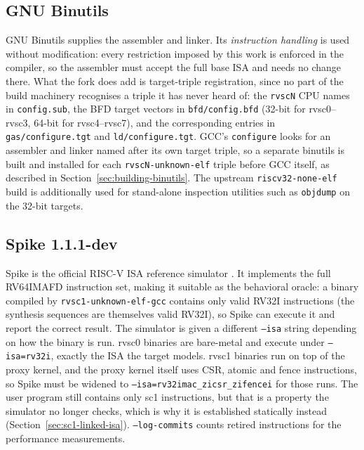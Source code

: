\subsection{GNU Binutils} \label{sec:binutils}

GNU Binutils supplies the assembler and linker. Its \emph{instruction handling} is used without
modification: every restriction imposed by this work is enforced in the compiler, so the assembler
must accept the full base ISA and needs no change there. What the fork does add is target-triple
registration, since no part of the build machinery recognises a triple it has never heard of:
the \texttt{rvscN} CPU names in \texttt{config.sub}, the BFD target vectors in
\texttt{bfd/config.bfd} (32-bit for rvsc0--rvsc3, 64-bit for rvsc4--rvsc7), and the corresponding
entries in \texttt{gas/configure.tgt} and \texttt{ld/configure.tgt}. GCC's \texttt{configure}
looks for an assembler and linker named after its own target triple, so a separate binutils is built
and installed for each \texttt{rvscN-unknown-elf} triple before GCC itself, as described in
Section~\ref{sec:building-binutils}. The upstream \texttt{riscv32-none-elf} build is additionally used
for stand-alone inspection utilities such as \texttt{objdump} on the 32-bit targets.

\subsection{Spike 1.1.1-dev}

Spike is the official RISC-V ISA reference simulator \cite{spike}. It implements the full
RV64IMAFD instruction set, making it suitable as the behavioral oracle: a binary compiled by
\texttt{rvsc1-unknown-elf-gcc} contains only valid RV32I instructions (the synthesis sequences are
themselves valid RV32I), so Spike can execute it and report the correct result. The simulator is given
a different \texttt{--isa} string depending on how the binary is run. rvsc0 binaries are bare-metal and
execute under \texttt{--isa=rv32i}, exactly the ISA the target models. rvsc1 binaries run on top of the
proxy kernel, and the proxy kernel itself uses CSR, atomic and fence instructions, so Spike must be
widened to \texttt{--isa=rv32imac\_zicsr\_zifencei} for those runs. The user program still contains
only sc1 instructions, but that is a property the simulator no longer checks, which is why it is
established statically instead (Section~\ref{sec:sc1-linked-isa}). \texttt{--log-commits} counts
retired instructions for the performance measurements.

